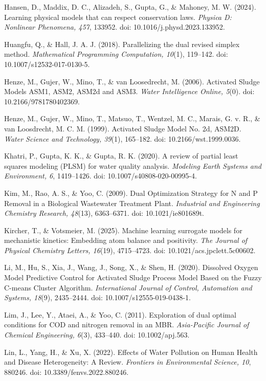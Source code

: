 \documentclass[a4paper,fleqn]{cas-sc}
\begin{document}
\noindent Hansen, D., Maddix, D. C., Alizadeh, S., Gupta, G., \& Mahoney, M. W. (2024). Learning physical models that can respect conservation laws. \textit{Physica D: Nonlinear Phenomena, 457}, 133952. doi: 10.1016/j.physd.2023.133952.

\noindent Huangfu, Q., \& Hall, J. A. J. (2018). Parallelizing the dual revised simplex method. \textit{Mathematical Programming Computation, 10}(1), 119--142. doi: 10.1007/s12532-017-0130-5.

\noindent Henze, M., Gujer, W., Mino, T., \& van Loosedrecht, M. (2006). Activated Sludge Models ASM1, ASM2, ASM2d and ASM3. \textit{Water Intelligence Online, 5}(0). doi: 10.2166/9781780402369.

\noindent Henze, M., Gujer, W., Mino, T., Matsuo, T., Wentzel, M. C., Marais, G. v. R., \& van Loosdrecht, M. C. M. (1999). Activated Sludge Model No. 2d, ASM2D. \textit{Water Science and Technology, 39}(1), 165--182. doi: 10.2166/wst.1999.0036.

\noindent Khatri, P., Gupta, K. K., \& Gupta, R. K. (2020). A review of partial least squares modeling (PLSM) for water quality analysis. \textit{Modeling Earth Systems and Environment, 6}, 1419--1426. doi: 10.1007/s40808-020-00995-4.

\noindent Kim, M., Rao, A. S., \& Yoo, C. (2009). Dual Optimization Strategy for N and P Removal in a Biological Wastewater Treatment Plant. \textit{Industrial and Engineering Chemistry Research, 48}(13), 6363--6371. doi: 10.1021/ie801689t.

\noindent Kircher, T., \& Votsmeier, M. (2025). Machine learning surrogate models for mechanistic kinetics: Embedding atom balance and positivity. \textit{The Journal of Physical Chemistry Letters, 16}(19), 4715--4723. doi: 10.1021/acs.jpclett.5c00602.

\noindent Li, M., Hu, S., Xia, J., Wang, J., Song, X., \& Shen, H. (2020). Dissolved Oxygen Model Predictive Control for Activated Sludge Process Model Based on the Fuzzy C-means Cluster Algorithm. \textit{International Journal of Control, Automation and Systems, 18}(9), 2435--2444. doi: 10.1007/s12555-019-0438-1.

\noindent Lim, J., Lee, Y., Ataei, A., \& Yoo, C. (2011). Exploration of dual optimal conditions for COD and nitrogen removal in an MBR. \textit{Asia-Pacific Journal of Chemical Engineering, 6}(3), 433--440. doi: 10.1002/apj.563.

\noindent Lin, L., Yang, H., \& Xu, X. (2022). Effects of Water Pollution on Human Health and Disease Heterogeneity: A Review. \textit{Frontiers in Environmental Science, 10}, 880246. doi: 10.3389/fenvs.2022.880246.
\end{document}
